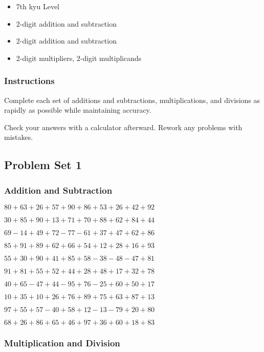 \begin{itemize}
\item
  7th kyu Level
\item
  2-digit addition and subtraction
\item
  2-digit addition and subtraction
\item
  2-digit multipliers, 2-digit multiplicands
\end{itemize}

\hypertarget{instructions-1}{%
\subsubsection{Instructions}\label{instructions-1}}

Complete each set of additions and subtractions, multiplications, and
divisions as rapidly as possible while maintaining accuracy.

Check your answers with a calculator afterward. Rework any problems with
mistakes.

\hypertarget{problem-set-1-1}{%
\subsection{Problem Set 1}\label{problem-set-1-1}}

\hypertarget{addition-and-subtraction-41}{%
\subsubsection{Addition and
Subtraction}\label{addition-and-subtraction-41}}

\(80+63+26+57+90+86+53+26+42+ 92\)

\(30+85+90+13+71+70+88+62+84+44\)

\(69-14+49+72-77-61+37+47+62+86\)

\(85+91+89+62+66+54+12+28+16+93\)

\(55+30+90+41+85+58-38-48-47+81\)

\(91+81+55+52+44+28+48+17+32+78\)

\(40+65-47+44-95+76-25+60+50+17\)

\(10+35+10+26+76+89+75+63+87+13\)

\(97+55+57-40+58+12-13-79+20+80\)

\(68+26+86+65+46+97+36+60+18+83\)

\hypertarget{multiplication-and-division-41}{%
\subsubsection{Multiplication and
Division}\label{multiplication-and-division-41}}

